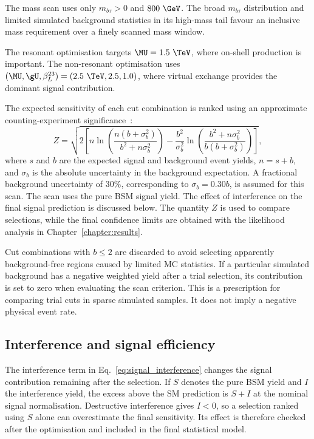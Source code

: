 The mass scan uses only $m_{b\tau}>0$ and $800~\GeV$.
The broad $m_{b\tau}$ distribution and limited simulated background statistics in its high-mass tail favour an inclusive mass requirement over a finely scanned mass window.

The resonant optimisation targets $\MU=1.5~\TeV$, where on-shell production is important.
The non-resonant optimisation uses $(\MU,\gU,\beta_L^{23})=(2.5~\TeV,2.5,1.0)$, where virtual exchange provides the dominant signal contribution.

The expected sensitivity of each cut combination is ranked using an approximate counting-experiment significance~\cite{ATL-PHYS-PUB-2020-025}:
\begin{equation}
    Z = \sqrt{2\left[n\ln\!\left(\frac{n(b+\sigma_b^2)}{b^2+n\sigma_b^2}\right)-\frac{b^2}{\sigma_b^2}\ln\!\left(\frac{b^2+n\sigma_b^2}{b(b+\sigma_b^2)}\right)\right]},
    \label{eq:ch7_optimisation_significance}
\end{equation}
where $s$ and $b$ are the expected signal and background event yields, $n=s+b$, and $\sigma_b$ is the absolute uncertainty in the background expectation.
A fractional background uncertainty of $30\%$, corresponding to $\sigma_b=0.30b$, is assumed for this scan.
The scan uses the pure BSM signal yield.
The effect of interference on the final signal prediction is discussed below.
The quantity $Z$ is used to compare selections, while the final confidence limits are obtained with the likelihood analysis in Chapter~\ref{chapter:results}.

Cut combinations with $b\leq2$ are discarded to avoid selecting apparently background-free regions caused by limited MC statistics.
If a particular simulated background has a negative weighted yield after a trial selection, its contribution is set to zero when evaluating the scan criterion.
This is a prescription for comparing trial cuts in sparse simulated samples.
It does not imply a negative physical event rate.

\subsection{Interference and signal efficiency}
\label{subsec:ch7_efficiency}

The interference term in Eq.~\ref{eq:signal_interference} changes the signal contribution remaining after the selection.
If $S$ denotes the pure BSM yield and $I$ the interference yield, the excess above the SM prediction is $S+I$ at the nominal signal normalisation.
Destructive interference gives $I<0$, so a selection ranked using $S$ alone can overestimate the final sensitivity.
Its effect is therefore checked after the optimisation and included in the final statistical model.

